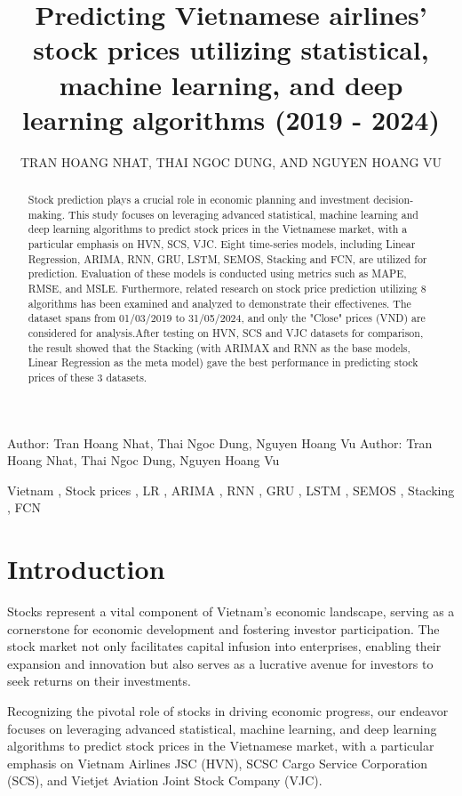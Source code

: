 \documentclass{ieeeojies}
\title{\fontsize{21}{25}\selectfont Predicting Vietnamese airlines' stock prices utilizing statistical, machine learning, and deep learning algorithms (2019 - 2024)}
\author{\uppercase{Tran Hoang Nhat}\authorrefmark{1},
\uppercase{Thai Ngoc Dung\authorrefmark{2}, and Nguyen Hoang Vu}\authorrefmark{3}}
\begin{document}
\markboth
{Author: Tran Hoang Nhat, Thai Ngoc Dung, Nguyen Hoang Vu}
{Author: Tran Hoang Nhat, Thai Ngoc Dung, Nguyen Hoang Vu}

\begin{abstract}

Stock prediction plays a crucial role in economic planning and investment decision-making. This study focuses on leveraging advanced statistical,  machine learning and deep learning algorithms to predict stock prices in the Vietnamese market, with a particular emphasis on HVN, SCS, VJC. Eight time-series models, including Linear Regression, ARIMA,  RNN, GRU, LSTM, SEMOS, Stacking and FCN, are utilized for prediction. Evaluation of these models is conducted using metrics such as MAPE, RMSE, and MSLE. Furthermore, related research on stock price prediction utilizing 8 algorithms has been examined and analyzed to demonstrate their effectivenes. The dataset spans from 01/03/2019 to 31/05/2024, and only the "Close" prices (VND) are considered for analysis.After testing on HVN, SCS and VJC datasets for comparison, the result showed that the Stacking (with ARIMAX and RNN as the base models, Linear Regression as the meta model) gave the best performance in predicting stock prices of these 3 datasets.

\end{abstract}
\begin{keywords}
    Vietnam , Stock prices , LR , ARIMA , RNN , GRU , LSTM , SEMOS , Stacking , FCN
\end{keywords}


\titlepgskip=-30pt

\maketitle

\section{Introduction}
\label{sec:introduction}

Stocks represent a vital component of Vietnam's economic landscape, serving as a cornerstone for economic development and fostering investor participation. The stock market not only facilitates capital infusion into enterprises, enabling their expansion and innovation but also serves as a lucrative avenue for investors to seek returns on their investments.

Recognizing the pivotal role of stocks in driving economic progress, our endeavor focuses on leveraging advanced statistical, machine learning, and deep learning algorithms to predict stock prices in the Vietnamese market, with a particular emphasis on Vietnam Airlines JSC (HVN), SCSC Cargo Service Corporation (SCS), and Vietjet Aviation Joint Stock Company (VJC).
\end{document}
